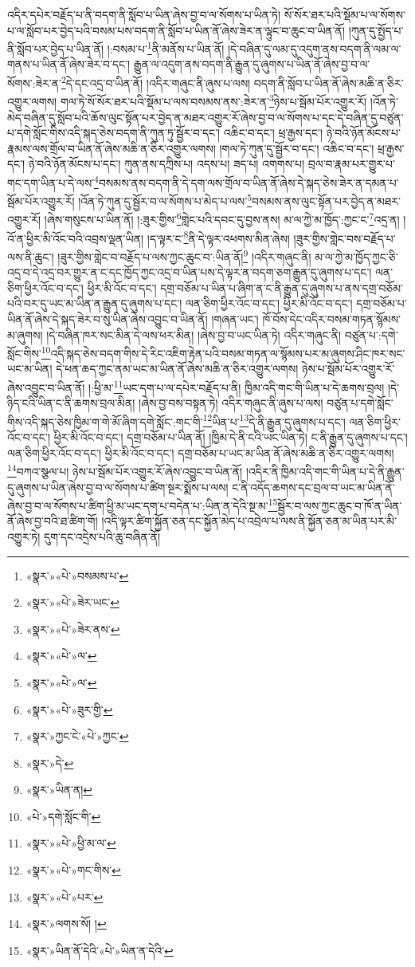 འདིར་དཔེར་བརྗོད་པ་ནི་བདག་ནི་སློབ་པ་ཡིན་ཞེས་བྱ་བ་ལ་སོགས་པ་ཡིན་ཏེ། སོ་སོར་ཐར་པའི་སྡོམ་པ་ལ་སོགས་པ་ལ་སློབ་པར་བྱེད་པའི་བསམ་པས་བདག་ནི་སློབ་པ་ཡིན་ནོ་ཞེས་ཟེར་ན་ལྟུང་བ་ཆུང་བ་ཡིན་ནོ། །ཀུན་དུ་སྤྱོད་པ་ནི་སློབ་པར་བྱེད་པ་ཡིན་ནོ། །:བསམ་པ་\footnote{«སྣར་»«པེ་»བསམས་པ་}ནི་མནོས་པ་ཡིན་ནོ། །དེ་བཞིན་དུ་ལམ་དུ་འདུག་ནས་བདག་ནི་ལམ་ལ་གནས་པ་ཡིན་ནོ་ཞེས་ཟེར་བ་དང་། རྒྱུན་ལ་འདུག་ནས་བདག་ནི་རྒྱུན་དུ་ཞུགས་པ་ཡིན་ནོ་ཞེས་བྱ་བ་ལ་སོགས་:ཟེར་ན་\footnote{«སྣར་»«པེ་»ཟེར་ཡང་}དེ་དང་འདྲ་བ་ཡིན་ནོ། །འདིར་གཞུང་ནི་ཞུས་པ་ལས། བདག་ནི་སློབ་པ་ཡིན་ནོ་ཞེས་མཆི་ན་ཅིར་འགྱུར་ལགས། གལ་ཏེ་སོ་སོར་ཐར་པའི་སྡོམ་པ་ལས་བསམས་ནས་:ཟེར་ན་\footnote{«སྣར་»«པེ་»ཟེར་ནས་}ཉེས་པ་སྦོམ་པོར་འགྱུར་རོ། །འོན་ཏེ་མེད་བཞིན་དུ་སློབ་པའི་ཆོས་ལུང་སྟོན་པར་བྱེད་ན་མཐར་འགྱུར་རོ་ཞེས་བྱ་བ་ལ་སོགས་པ་དང་དེ་བཞིན་དུ་བཙུན་པ་དགེ་སློང་གིས་འདི་སྐད་ཅེས་བདག་ནི་ཀུན་ཏུ་སྦྱོར་བ་དང་། འཆིང་བ་དང་། ཕྲ་རྒྱས་དང་། ཉེ་བའི་ཉོན་མོངས་པ་རྣམས་ལས་གྲོལ་བ་ཡིན་ནོ་ཞེས་མཆི་ན་ཅིར་འགྱུར་ལགས། །གལ་ཏེ་ཀུན་དུ་སྦྱོར་བ་དང་། འཆིང་བ་དང་། ཕྲ་རྒྱས་དང་། ཉེ་བའི་ཉོན་མོངས་པ་དང་། ཀུན་ནས་དཀྲིས་པ། འདས་པ། ཟད་པ། འགགས་པ། བྲལ་བ་རྣམ་པར་གྱུར་པ་གང་དག་ཡིན་པ་དེ་ལས་\footnote{«སྣར་»«པེ་»ལ་}བསམས་ནས་བདག་ནི་དེ་དག་ལས་གྲོལ་བ་ཡིན་ནོ་ཞེས་དེ་སྐད་ཅེས་ཟེར་ན་དམན་པ་སྦོམ་པོར་འགྱུར་རོ། །འོན་ཏེ་ཀུན་དུ་སྦྱོར་བ་ལ་སོགས་པ་མེད་པ་ལས་\footnote{«སྣར་»«པེ་»ལ་}བསམས་ནས་ལུང་སྟོན་པར་བྱེད་ན་མཐར་འགྱུར་རོ། །ཞེས་གསུངས་པ་ཡིན་ནོ། །:ཟུར་གྱིས་\footnote{«སྣར་»«པེ་»ཟུར་གྱི་}གླེང་པའི་དབང་དུ་བྱས་ནས། མ་ལ་ཀྱེ་མ་ཁྱོད་:ཀྱང་ང་\footnote{«སྣར་»ཀྱང་ངེ་«པེ་»ཀྱང་}འདྲ་ན། །འོ་ན་ཕྱིར་མི་འོང་བའི་འབྲས་ལྡན་ཡིན། །ད་ལྟར་ང་\footnote{«སྣར་»དེ་}ནི་དེ་ལྟར་འཕགས་མིན་ཞེས། །ཟུར་གྱིས་གླེང་བས་བརྗོད་པ་ལས་ནི་ཆུང་། །ཟུར་གྱིས་གླེང་བ་བརྗོད་པ་ལས་ཀྱང་ཆུང་བ་:ཡིན་ནོ།\footnote{«སྣར་»ཡིན་ན།} །འདིར་གཞུང་ནི། མ་ལ་ཀྱེ་མ་ཁྱོད་ཀྱང་ཅི་འདྲ་བ་དེ་འདྲ་བར་གྱུར་ན་ང་དང་ཁྱོད་ཀྱང་འདྲ་བ་ཡིན་པས་དེ་ལྟར་ན་བདག་ཅག་རྒྱུན་དུ་ཞུགས་པ་དང་། ལན་ཅིག་ཕྱིར་འོང་བ་དང་། ཕྱིར་མི་འོང་བ་དང་། དགྲ་བཅོམ་པ་ཡིན་པ་ཞིག་ན་ང་ནི་རྒྱུན་དུ་ཞུགས་པ་ནས་དགྲ་བཅོམ་པའི་བར་དུ་ཡང་མ་ཡིན་ན་རྒྱུན་དུ་ཞུགས་པ་དང་། ལན་ཅིག་ཕྱིར་འོང་བ་དང་། ཕྱིར་མི་འོང་བ་དང་། དགྲ་བཅོམ་པ་ཡིན་ནོ་ཞེས་དེ་སྐད་ཟེར་བ་སུ་ཡིན་ཞེས་འབྱུང་བ་ཡིན་ནོ། །གཞན་ཡང་། ཁོ་བོས་དེང་འདིར་བསམ་གཏན་སྙོམས་མ་ཞུགས། །དེ་བཞིན་ཁར་སང་མིན་དེ་ལས་ཕར་མིན། །ཞེས་བྱ་བ་ཡང་ཡིན་ཏེ། འདིར་གཞུང་ནི། བཙུན་པ་:དགེ་སློང་གིས་\footnote{«པེ་»དགེ་སློང་གི་}འདི་སྐད་ཅེས་བདག་གིས་དེ་རིང་འཇིག་རྟེན་པའི་བསམ་གཏན་ལ་སྙོམས་པར་མ་ཞུགས་ཤིང་ཁར་སང་ཡང་མ་ཡིན། དེ་ཕན་ཆད་ཀྱང་ནམ་ཡང་མ་ཡིན་ནོ་ཞེས་མཆི་ན་ཅིར་འགྱུར་ལགས། ཉེས་པ་སྦོམ་པོར་འགྱུར་རོ་ཞེས་འབྱུང་བ་ཡིན་ནོ། །:ཕྱི་མ་\footnote{«སྣར་»«པེ་»ཕྱི་མ་ལ་}ཡང་དག་པ་ལ་དཔེར་བརྗོད་པ་ནི། ཁྱིམ་འདི་གང་གི་ཡིན་པ་དེ་ཆགས་བྲལ། །དེ་ཉིད་ངའི་ཡིན་ང་ནི་ཆགས་བྲལ་མིན། །ཞེས་བྱ་བས་བསྟན་ཏེ། འདིར་གཞུང་ནི་ཞུས་པ་ལས། བཙུན་པ་དགེ་སློང་གིས་འདི་སྐད་ཅེས་ཁྱིམ་ག་གེ་མོ་ཞིག་དགེ་སློང་:གང་གི་\footnote{«སྣར་»«པེ་»གང་གིས་}ཡིན་པ་\footnote{«སྣར་»«པེ་»པར་}དེ་ནི་རྒྱུན་དུ་ཞུགས་པ་དང་། ལན་ཅིག་ཕྱིར་འོང་བ་དང་། ཕྱིར་མི་འོང་བ་དང་། དགྲ་བཅོམ་པ་ཡིན་ནོ། །ཁྱིམ་དེ་ནི་ངའི་ཡང་ཡིན་ཏེ། ང་ནི་རྒྱུན་དུ་ཞུགས་པ་དང་། ལན་ཅིག་ཕྱིར་འོང་བ་དང་། ཕྱིར་མི་འོང་བ་དང་། དགྲ་བཅོམ་པ་ཡང་མ་ཡིན་ནོ་ཞེས་མཆི་ན་ཅིར་འགྱུར་ལགས། \footnote{«སྣར་»ལགས་སོ། ། }བཀའ་སྩལ་པ། ཉེས་པ་སྦོམ་པོར་འགྱུར་རོ་ཞེས་འབྱུང་བ་ཡིན་ནོ། །འདིར་ནི་ཁྱིམ་འདི་གང་གི་ཡིན་པ་དེ་ནི་རྒྱུན་དུ་ཞུགས་པ་ཡིན་ཞེས་བྱ་བ་ལ་སོགས་པ་ཚིག་སྔར་སྨོས་པ་ལས། ང་ནི་འདོད་ཆགས་དང་བྲལ་བ་ཡང་མ་ཡིན་ནོ་ཞེས་བྱ་བ་ལ་སོགས་པ་ཚིག་ཕྱི་མ་ཡང་དག་པ་བདེན་པ་:ཡིན་ན་དེའི་སྔ་མ་\footnote{«སྣར་»ཡིན་ནོ་དེའི་«པེ་»ཡིན་ན་དེའི་}སྦྱོར་བ་ལས་ཀྱང་ཆུང་བ་ཁོ་ན་ཡིན་ནོ་ཞེས་བྱ་བའི་ཐ་ཚིག་གོ། །འདི་ལྟར་ཚིག་སྐྱོན་ཅན་དང་སྐྱོན་མེད་པ་འབྲེལ་པ་ལས་ནི་སྐྱོན་ཅན་མ་ཡིན་པར་མི་འགྱུར་ཏེ། དུག་དང་འདྲེས་པའི་ཆུ་བཞིན་ནོ། 